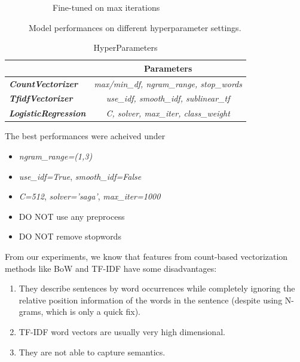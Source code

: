 \begin{figure}[!ht]
\begin{subfigure}[]{0.225\textwidth}
        \caption[]%
        {{\small Fine-tuned on max iterations}}
        \label{fig:numberofcharacters}
    \end{subfigure}
    \caption[]
    {\small Model performances on different hyperparameter settings.} 
    \label{fig:hyper}
\end{figure}

\begin{table}[ht]  %
\centering  %
\caption{HyperParameters}
\begin{tabular}{lc}
\hline
&    \textbf{Parameters}\\
\hline
 \textbf{\textit{CountVectorizer}}   & \textit{max/min\_df, ngram\_range, stop\_words} \\
 \textbf{\textit{TfidfVectorizer}} &  \textit{use\_idf, smooth\_idf, sublinear\_tf} \\
 \textbf{\textit{LogisticRegression}} &  \textit{C, solver, max\_iter, class\_weight} \\
\hline
\end{tabular}
\label{tab:supervised}
\end{table}

The best performances were acheived under
\begin{itemize}
\item \textit{ngram\_range=(1,3)}
\item \textit{use\_idf=True}, \textit{smooth\_idf=False}
\item \textit{C=512}, \textit{solver='saga'}, \textit{max\_iter=1000}
\item DO NOT use any preprocess
\item DO NOT remove stopwords
\end{itemize}

From our experiments, we know that features from count-based vectorization methods like BoW and TF-IDF have some disadvantages:

\begin{enumerate}
\item They describe sentences by word occurrences while completely ignoring the relative position information of the words in the sentence (despite using N-grams, which is only a quick fix). 
\item TF-IDF word vectors are usually very high dimensional.
\item They are not able to capture semantics.
\end{enumerate}


